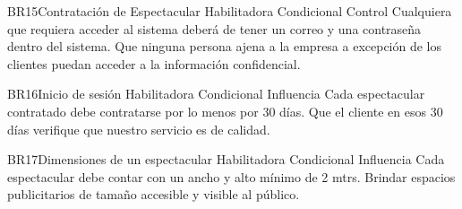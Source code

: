 \hypertarget{BR:BR15}{}
\begin{BussinesRule}{BR15}{Contratación de Espectacular}%
    \BRitem[Tipo: ] Habilitadora
    \BRitem[Clase:] Condicional
    \BRitem[Nivel:] Control
    \BRitem[Descripción:] Cualquiera que requiera acceder al sistema deberá de tener un correo y una contraseña dentro del sistema.
    \BRitem[Motivación: ] Que ninguna persona ajena a la empresa a excepción de los clientes puedan acceder a la información confidencial.
\end{BussinesRule}

\hypertarget{BR:BR16}{}
\begin{BussinesRule}{BR16}{Inicio de sesión}%
    \BRitem[Tipo: ] Habilitadora
    \BRitem[Clase:] Condicional
    \BRitem[Nivel:] Influencia
    \BRitem[Descripción:] Cada espectacular contratado debe contratarse por lo menos por 30 días.
    \BRitem[Motivación: ] Que el cliente en esos 30 días verifique que nuestro servicio es de calidad.
\end{BussinesRule}

\hypertarget{BR:BR17}{}
\begin{BussinesRule}{BR17}{Dimensiones de un espectacular}%
    \BRitem[Tipo: ] Habilitadora
    \BRitem[Clase:] Condicional
    \BRitem[Nivel:] Influencia
    \BRitem[Descripción:] Cada espectacular debe contar con un ancho y alto mínimo de 2 mtrs.
    \BRitem[Motivación: ] Brindar espacios publicitarios de tamaño accesible y visible al público.
\end{BussinesRule}

\clearpage